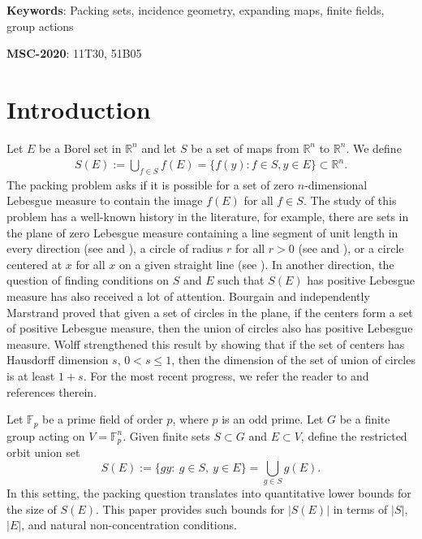 \documentclass[11pt]{article}
\def\R{\mathbb{R}}
\def \R{{\mathbb R}}
\begin{document}
\textbf{Keywords}: Packing sets, incidence geometry, expanding maps, finite fields, group actions

\textbf{MSC-2020}: 11T30, 51B05

\tableofcontents
\section{Introduction}

Let $E$ be a Borel set in $\mathbb{R}^n$ and let $S$ be a set of maps from $\mathbb{R}^n$ to $\mathbb{R}^n$. We define 
\begin{align*}
    S(E):=\bigcup_{f\in S}f(E)=\{f(y): f\in S, y\in E\}\subset \R^n.
\end{align*}
The packing problem asks if it is possible for a set of zero $n$-dimensional Lebesgue measure to contain the image $f(E)$ for all $f\in S$. The study of this problem has a well-known history in the literature, for example, there are sets in the plane of zero Lebesgue measure containing  a line segment of unit length in every direction (see \cite{Besicovitch20} and \cite{Besicovitch28}), a circle of radius $r$ for all $r>0$ (see \cite{BesicovitchRado68} and \cite{Kinney68}), or a circle centered at $x$ for all $x$ on a given straight line (see \cite{Talagrand80}). In another direction, the question of finding conditions on $S$ and $E$ such that $S(E)$ has positive Lebesgue measure has also received a lot of attention. Bourgain \cite{Bourgain85} and independently Marstrand \cite{Marstrand87} proved that given a set of circles in the plane, if the centers form a set of positive Lebesgue measure, then the union of circles also has positive Lebesgue measure. Wolff \cite{Wolff97} strengthened this result by showing that if the set of centers has Hausdorff dimension $s$, $0<s\leq 1$, then the dimension of the set of union of circles is at least $1+s$. For the most recent progress, we refer the reader to \cite{Iosevichetal} and references therein. 

Let $\mathbb{F}_p$ be a prime field of order $p$, where $p$ is an odd prime. Let $G$ be a finite group acting on $V=\mathbb{F}_p^n$.
Given finite sets $S\subset G$ and $E\subset V$, define the restricted orbit union set
\[
S(E):=\{gy:\ g\in S,\ y\in E\}=\bigcup_{g\in S} g(E).
\]
In this setting, the packing question translates into quantitative lower bounds for the size of $S(E)$. This paper provides such bounds for $|S(E)|$ in terms of $|S|$, $|E|$, and natural non-concentration conditions.
\end{document}
